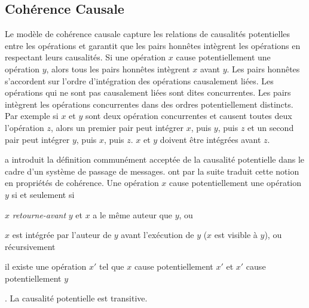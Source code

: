 \subsection{Cohérence Causale}\label{subsec:caucal-consistency}

Le modèle de cohérence causale capture les relations de causalités potentielles entre les opérations et garantit que les pairs honnêtes intègrent les opérations en respectant leurs causalités.
Si une opération $x$ cause potentiellement une opération $y$, alors tous les pairs honnêtes intègrent $x$ avant $y$.
Les pairs honnêtes s'accordent sur l'ordre d'intégration des opérations causalement liées.
Les opérations qui ne sont pas causalement liées sont dites concurrentes.
Les pairs intègrent les opérations concurrentes dans des ordres potentiellement distincts.
Par exemple si $x$ et $y$ sont deux opération concurrentes et causent toutes deux l'opération $z$, alors un premier pair peut intégrer $x$, puis $y$, puis $z$ et un second pair peut intégrer $y$, puis $x$, puis $z$.
$x$ et $y$ doivent être intégrées avant $z$.

\textcite{lamport_1978_time} a introduit la définition communément acceptée de la causalité potentielle dans le cadre d'un système de passage de messages.
\textcite{hutto_1990_causal} ont par la suite traduit cette notion en propriétés de cohérence.
Une opération $x$ cause potentiellement une opération $y$ si et seulement si \begin{inlinelist}
    \item $x$ \emph{retourne-avant} $y$ et $x$ a le même auteur que $y$, ou
    \item $x$ est intégrée par l'auteur de $y$ avant l'exécution de $y$ ($x$ est visible à $y$), ou récursivement
    \item il existe une opération $x'$ tel que $x$ cause potentiellement $x'$ et $x'$ cause potentiellement $y$
\end{inlinelist}.
La causalité potentielle est transitive.

